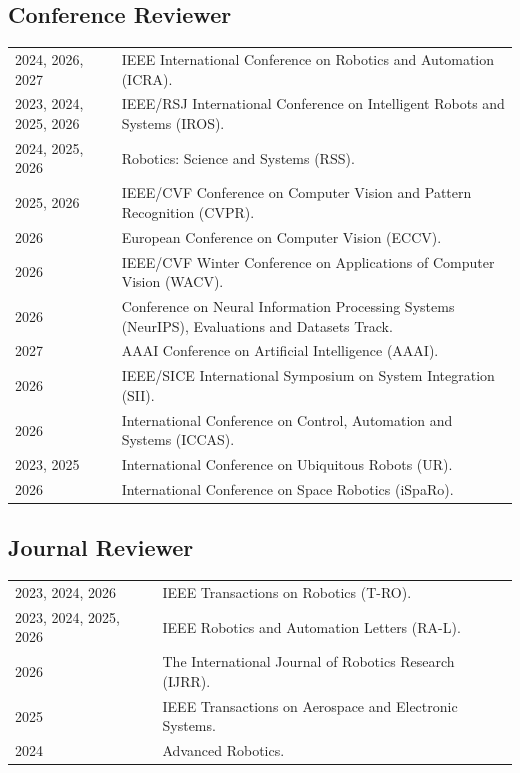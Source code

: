 \documentclass[10pt,a4paper]{article}
\newcommand{\daterow}[2]{#1 & #2 \\[2.2pt]}
\begin{document}
\subsection{Conference Reviewer}
\begin{tabularx}{\textwidth}{@{}L{50mm}Y@{}}
\daterow{2024, 2026, 2027}{IEEE International Conference on Robotics and Automation (ICRA).}
\daterow{2023, 2024, 2025, 2026}{IEEE/RSJ International Conference on Intelligent Robots and Systems (IROS).}
\daterow{2024, 2025, 2026}{Robotics: Science and Systems (RSS).}
\daterow{2025, 2026}{IEEE/CVF Conference on Computer Vision and Pattern Recognition (CVPR).}
\daterow{2026}{European Conference on Computer Vision (ECCV).}
\daterow{2026}{IEEE/CVF Winter Conference on Applications of Computer Vision (WACV).}
\daterow{2026}{Conference on Neural Information Processing Systems (NeurIPS), Evaluations and Datasets Track.}
\daterow{2027}{AAAI Conference on Artificial Intelligence (AAAI).}
\daterow{2026}{IEEE/SICE International Symposium on System Integration (SII).}
\daterow{2026}{International Conference on Control, Automation and Systems (ICCAS).}
\daterow{2023, 2025}{International Conference on Ubiquitous Robots (UR).}
\daterow{2026}{International Conference on Space Robotics (iSpaRo).}
\end{tabularx}

\subsection{Journal Reviewer}
\begin{tabularx}{\textwidth}{@{}L{50mm}Y@{}}
\daterow{2023, 2024, 2026}{IEEE Transactions on Robotics (T-RO).}
\daterow{2023, 2024, 2025, 2026}{IEEE Robotics and Automation Letters (RA-L).}
\daterow{2026}{The International Journal of Robotics Research (IJRR).}
\daterow{2025}{IEEE Transactions on Aerospace and Electronic Systems.}
\daterow{2024}{Advanced Robotics.}
\end{tabularx}
\end{document}
